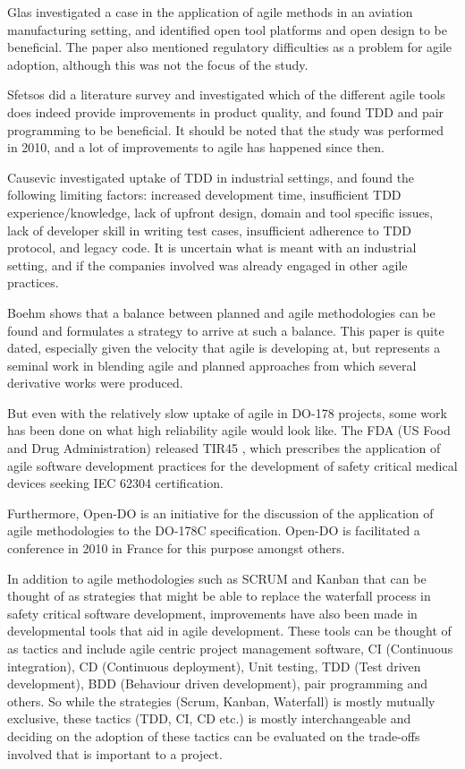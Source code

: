\documentclass{sig-alternate-05-2015}
\begin{document}
Glas \cite{Glas_2009} investigated a case in the application of agile methods in an aviation manufacturing setting, and identified open tool platforms and open design to be beneficial. The paper also mentioned regulatory difficulties as a problem for agile adoption, although this was not the focus of the study.  

Sfetsos \cite{Sfetsos_2010} did a literature survey and investigated which of the different agile tools does indeed provide improvements in product quality, and found TDD and pair programming to be beneficial. It should be noted that the study was performed in 2010, and a lot of improvements to agile has happened since then.

Causevic \cite{Causevic_2011} investigated uptake of TDD in industrial settings, and found the following limiting factors: increased development time, insufficient TDD experience/knowledge, lack of upfront design, domain and tool specific issues, lack of developer skill in writing test cases, insufficient adherence to TDD protocol, and legacy code. It is uncertain what is meant with an industrial setting, and if the companies involved was already engaged in other agile practices. 
 
Boehm \cite{Boehm_2003} shows that a balance between planned and agile methodologies can be found and formulates a strategy to arrive at such a balance. This paper is quite dated, especially given the velocity that agile is developing at, but represents a seminal work in blending agile and planned approaches from which several derivative works were produced. 

But even with the relatively slow uptake of agile in DO-178 projects, some work has been done on what high reliability agile would look like. The FDA (US Food and Drug Administration) released TIR45 \cite{AAMI_TIR45_2012}, which prescribes the application of agile software development practices for the development of safety critical medical devices seeking IEC 62304 certification. 

Furthermore, Open-DO \cite{OPEN-DO_2010} is an initiative for the discussion of the application of agile methodologies to the DO-178C specification. Open-DO is facilitated a conference in 2010 in France for this purpose amongst others. 

In addition to agile methodologies such as SCRUM and Kanban that can be thought of as strategies that might be able to replace the waterfall process in safety critical software development, improvements have also been made in developmental tools that aid in agile development. These tools can be thought of as tactics and include agile centric project management software, CI (Continuous integration), CD (Continuous deployment), Unit testing, TDD (Test driven development), BDD (Behaviour driven development), pair programming and others. So while the strategies (Scrum, Kanban, Waterfall) is mostly mutually exclusive, these tactics (TDD, CI, CD etc.) is mostly interchangeable and deciding on the adoption of these tactics can be evaluated on the trade-offs involved that is important to a project.    
\end{document}
